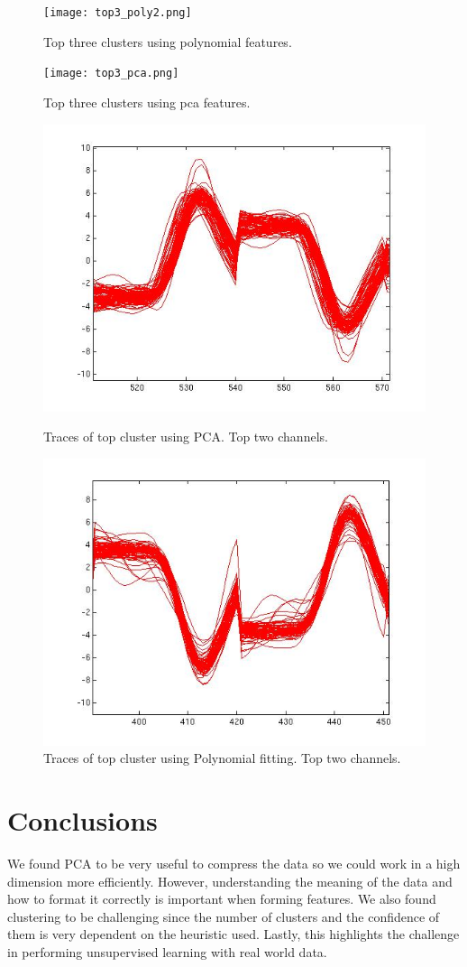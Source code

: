 \documentclass[conference]{IEEEtran}
\begin{document}
\begin{figure}
\centering
\texttt{[image: top3\_poly2.png]}
\caption{Top three clusters using polynomial features.}
\texttt{[image: top3\_pca.png]}
\caption{Top three clusters using pca features.}
\end{figure}

\begin{figure}
\centering
\includegraphics[width=0.7\linewidth]{traces/clustertrace_pca_front.jpg}
\caption{Traces of top cluster using PCA. Top two channels.}
\includegraphics[width=0.7\linewidth]{traces/clustertrace_poly_front.jpg}
\caption{Traces of top cluster using Polynomial fitting. Top two
  channels.}

\end{figure}






\section{Conclusions}
We found PCA to be very useful to compress the data so we could work
in a high dimension more efficiently. However, understanding the
meaning of the data and how to format it correctly is important when
forming features. We also found clustering to be challenging since the
number of clusters and the confidence of them is very dependent on the
heuristic used.  Lastly, this highlights the challenge in performing
unsupervised learning with real world data.
\end{document}
